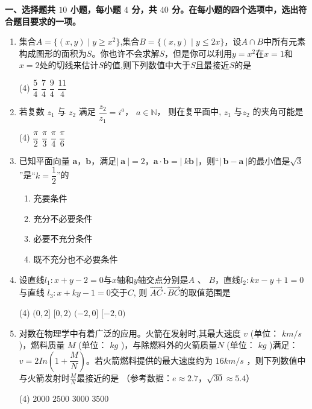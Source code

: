 \documentclass[11pt,a4paper]{ctexart}
\newcommand{\sectiontitle}[1]{
  \par\noindent\textbf{#1}\par%
  }
\begin{document}
\sectiontitle{一、选择题共 $10$ 小题，每小题 $4$ 分，共 $40$ 分。在每小题的四个选项中，选出符合题目要求的一项。}

\begin{enumerate}

    \item 集合$A=\{(x,y) \mid y \ge x^2\}$,集合$B=\{(x,y)\mid y \le 2x\}$，设$A \cap B$中所有元素构成图形的面积为$S$。你也许不会求解$S$，但是你可以利用$y=x^2$在$x=1$和$x=2$处的切线来估计$S$的值,则下列数值中大于$S$且最接近$S$的是
    \begin{tasks}(4)
        \task $\dfrac{5}{4}$ 
        \task $\dfrac{7}{4}$
        \task $\dfrac{9}{4}$
        \task $\dfrac{11}{4}$
    \end{tasks}

    \item 若复数 $z_1$ 与 $z_2$ 满足 $\dfrac{z_2}{z_1}=i^a $， $a \in \mathbb{N}$， 则在复平面中, $z_1$ 与$z_2$ 的夹角可能是
    \begin{tasks}(4)
        \task $\dfrac{\pi}{2}$ 
        \task $\dfrac{\pi}{3}$
        \task $\dfrac{\pi}{4}$
        \task $\dfrac{\pi}{6}$
    \end{tasks}

    \item 已知平面向量 $\boldsymbol{a}$，$\boldsymbol{b}$，满足$|\ \boldsymbol{a} \  |=2$，$ \boldsymbol{a} \cdot \boldsymbol{b} = |\ k \boldsymbol{b}\ |$，则“$|\ \boldsymbol{b} - \boldsymbol{a} \ |$的最小值是$\sqrt3$”是“$k=\dfrac{1}{2}$”的
    \begin{enumerate}[label=(\Alph*)]
        \item 充要条件
        \item 充分不必要条件
        \item 必要不充分条件
        \item 既不充分也不必要条件
    \end{enumerate}

    \item 设直线$l_1: x+y-2=0$与$x$轴和$y$轴交点分别是$A$ 、 $B$，直线$l_2:kx-y+1=0$ 与直线 $l_3:x+ky-1=0$交于$C$, 则  $\overrightarrow{AC} \cdot \overrightarrow{BC} $的取值范围是
    \begin{tasks}(4)
        \task $(0,2]$ 
        \task $[0,2)$
        \task $(-2,0]$
        \task $[-2,0)$
    \end{tasks}
    \newpage
    
    \item 对数在物理学中有着广泛的应用。火箭在发射时,其最大速度 $v$ (单位： $km/s$ )，燃料质量 $M$ (单位： $kg$ )，与除燃料外的火箭质量$N$ (单位： $kg$ )满足：$v=2In(1+\dfrac{M}{N})$。若火箭燃料提供的最大速度约为 $16km/s$ ，则下列数值中与火箭发射时$\frac{M}{N}$最接近的是 （参考数据：$e \approx 2.7$，$\sqrt{30} \approx 5.4$）
    \begin{tasks}(4)
        \task $2000$ 
        \task $2500$
        \task $3000$
        \task $3500$
    \end{tasks}


\end{enumerate}
\end{document}
